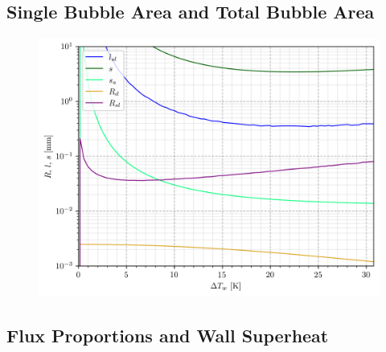 \subsection{Single Bubble Area and Total Bubble Area}

\begin{figure}
\end{figure}


\begin{figure}
\includegraphics[width=0.5\linewidth]{img/HFP/fullcomp_Koss/length_G2000.png}
\end{figure}

\subsection{Flux Proportions and Wall Superheat}

